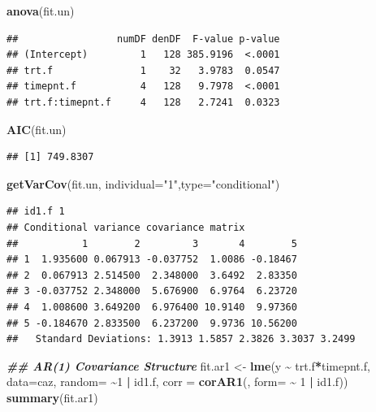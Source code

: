 \documentclass[
]{book}
\newenvironment{Shaded}{\begin{snugshade}}{\end{snugshade}}
\newcommand{\AttributeTok}[1]{\textcolor[rgb]{0.13,0.29,0.53}{#1}}
\newcommand{\DecValTok}[1]{\textcolor[rgb]{0.00,0.00,0.81}{#1}}
\newcommand{\DocumentationTok}[1]{\textcolor[rgb]{0.56,0.35,0.01}{\textbf{\textit{#1}}}}
\newcommand{\FunctionTok}[1]{\textcolor[rgb]{0.13,0.29,0.53}{\textbf{#1}}}
\newcommand{\NormalTok}[1]{#1}
\newcommand{\OtherTok}[1]{\textcolor[rgb]{0.56,0.35,0.01}{#1}}
\newcommand{\SpecialCharTok}[1]{\textcolor[rgb]{0.81,0.36,0.00}{\textbf{#1}}}
\newcommand{\StringTok}[1]{\textcolor[rgb]{0.31,0.60,0.02}{#1}}
\begin{document}
\begin{Shaded}
\begin{Highlighting}[]
\FunctionTok{anova}\NormalTok{(fit.un)}
\end{Highlighting}
\end{Shaded}

\begin{verbatim}
##                 numDF denDF  F-value p-value
## (Intercept)         1   128 385.9196  <.0001
## trt.f               1    32   3.9783  0.0547
## timepnt.f           4   128   9.7978  <.0001
## trt.f:timepnt.f     4   128   2.7241  0.0323
\end{verbatim}

\begin{Shaded}
\begin{Highlighting}[]
\FunctionTok{AIC}\NormalTok{(fit.un)}
\end{Highlighting}
\end{Shaded}

\begin{verbatim}
## [1] 749.8307
\end{verbatim}

\begin{Shaded}
\begin{Highlighting}[]
\FunctionTok{getVarCov}\NormalTok{(fit.un, }\AttributeTok{individual=}\StringTok{"1"}\NormalTok{,}\AttributeTok{type=}\StringTok{"conditional"}\NormalTok{)}
\end{Highlighting}
\end{Shaded}

\begin{verbatim}
## id1.f 1 
## Conditional variance covariance matrix
##           1        2         3       4        5
## 1  1.935600 0.067913 -0.037752  1.0086 -0.18467
## 2  0.067913 2.514500  2.348000  3.6492  2.83350
## 3 -0.037752 2.348000  5.676900  6.9764  6.23720
## 4  1.008600 3.649200  6.976400 10.9140  9.97360
## 5 -0.184670 2.833500  6.237200  9.9736 10.56200
##   Standard Deviations: 1.3913 1.5857 2.3826 3.3037 3.2499
\end{verbatim}

\begin{Shaded}
\begin{Highlighting}[]
\DocumentationTok{\#\# AR(1) Covariance Structure}
\NormalTok{fit.ar1 }\OtherTok{\textless{}{-}} \FunctionTok{lme}\NormalTok{(y }\SpecialCharTok{\textasciitilde{}}\NormalTok{ trt.f}\SpecialCharTok{*}\NormalTok{timepnt.f, }\AttributeTok{data=}\NormalTok{caz,}
\AttributeTok{random=} \SpecialCharTok{\textasciitilde{}}\DecValTok{1} \SpecialCharTok{|}\NormalTok{ id1.f,}
\AttributeTok{corr =} \FunctionTok{corAR1}\NormalTok{(, }\AttributeTok{form=} \SpecialCharTok{\textasciitilde{}} \DecValTok{1} \SpecialCharTok{|}\NormalTok{ id1.f))}
\FunctionTok{summary}\NormalTok{(fit.ar1)}
\end{Highlighting}
\end{Shaded}
\end{document}
